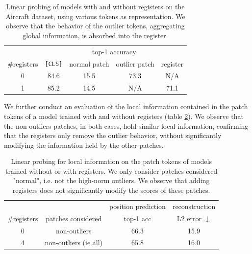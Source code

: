 \begin{table}[h]
    \centering
    \begin{tabular}{ccccc}
         \toprule
            & \multicolumn{4}{c}{top-1 accuracy} \\
         \#registers & \texttt{[CLS]} & normal patch & outlier patch & register \\
         \midrule
         0 & 84.6 & 15.5 & 73.3 & N/A \\
         1 & 85.2 & 14.5 & N/A & 71.1 \\
         \bottomrule
    \end{tabular}
    \caption{Linear probing of models with and without registers on the Aircraft dataset, using various tokens as representation. We observe that the behavior of the outlier tokens, aggregating global information, is absorbed into the register.}
    \label{tab:classif_logreg_token_types-acc}
\end{table}

We further conduct an evaluation of the local information contained in the patch tokens of a model trained with and without registers (table \ref{tab:classif_logreg_token_types-pos}). We observe that the non-outliers patches, in both cases, hold similar local information, confirming that the registers only remove the outlier behavior, without significantly modifying the information held by the other patches.




\begin{table}[h]
    \centering
    \begin{tabular}{cccc}
         \toprule
          & & position prediction & reconstruction \\
         \#registers& patches considered & top-1 acc & L2 error $\downarrow$ \\
         \midrule
         0 & non-outliers & 66.3 & 15.9  \\
         4 & non-outliers (ie all) & 65.8 & 16.0  \\
        \bottomrule
    \end{tabular}
    \caption{Linear probing for local information on the patch tokens of models trained without or with registers. We only consider patches considered "normal", i.e. not the high-norm outliers. We observe that adding registers does not significantly modify the scores of these patches.}
    \label{tab:classif_logreg_token_types-pos}
\end{table}


